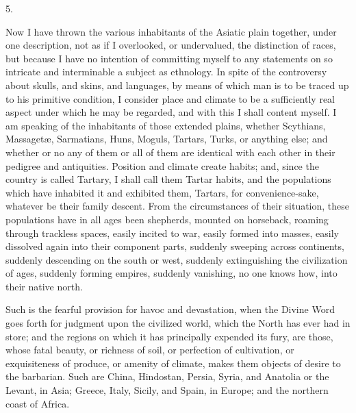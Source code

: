 5.

Now I have thrown the various
inhabitants of the Asiatic plain together, under one description, not
as if I overlooked, or undervalued, the distinction of races, but
because I have no intention of committing myself to any statements on
so intricate and interminable a subject as ethnology. In spite of the
controversy about skulls, and skins, and languages, by means of which
man is to be traced up to his primitive condition, I consider place
and climate to be a sufficiently real aspect under which he may be
regarded, and with this I shall content myself. I am speaking of the
inhabitants of those extended plains, whether Scythians, Massagetæ,
Sarmatians, Huns, Moguls, Tartars, Turks, or anything else; and
whether or no any of them or all of them are identical with each
other in their pedigree and antiquities. Position and climate create
habits; and, since the country is called Tartary, I shall call them
Tartar habits, and the populations which have inhabited it and
exhibited them, Tartars, for convenience-sake, whatever be their
family descent. From the circumstances of their situation, these
populations have in all ages been shepherds, mounted on horseback,
roaming through trackless spaces, easily incited to war, easily formed
into masses, easily dissolved again into their component parts,
suddenly sweeping across continents, suddenly descending on the south
or west, suddenly extinguishing the civilization of ages, suddenly
forming empires, suddenly vanishing, no one knows how, into their
native north.

Such is the fearful provision
for havoc and devastation, when the Divine Word goes forth for
judgment upon the civilized world, which the North has ever had in
store; and the regions on which it has principally expended its fury,
are those, whose fatal beauty, or richness of soil, or perfection of
cultivation, or exquisiteness of produce, or amenity of climate, makes
them objects of desire to the barbarian. Such are China, Hindostan,
Persia, Syria, and Anatolia or the Levant, in Asia; Greece, Italy,
Sicily, and Spain, in Europe; and the northern coast of Africa.

